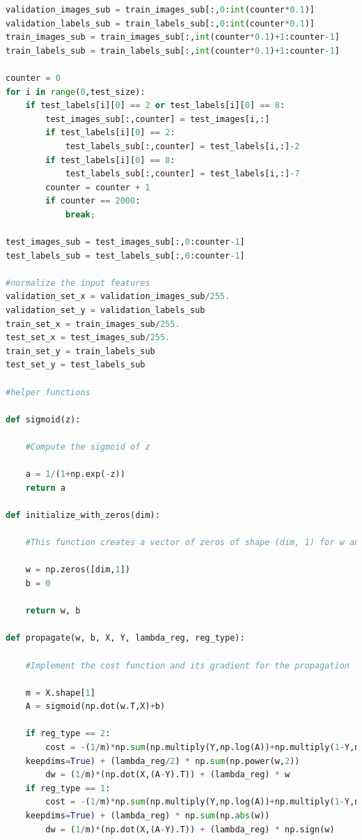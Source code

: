 \documentclass{article} %
\begin{document}
{\begin{lstlisting}[language=Python]
validation_images_sub = train_images_sub[:,0:int(counter*0.1)]
validation_labels_sub = train_labels_sub[:,0:int(counter*0.1)]
train_images_sub = train_images_sub[:,int(counter*0.1)+1:counter-1]
train_labels_sub = train_labels_sub[:,int(counter*0.1)+1:counter-1]

counter = 0
for i in range(0,test_size):
    if test_labels[i][0] == 2 or test_labels[i][0] == 8:
        test_images_sub[:,counter] = test_images[i,:]
        if test_labels[i][0] == 2:
            test_labels_sub[:,counter] = test_labels[i,:]-2
        if test_labels[i][0] == 8:
            test_labels_sub[:,counter] = test_labels[i,:]-7
        counter = counter + 1        
        if counter == 2000:
            break;
        
test_images_sub = test_images_sub[:,0:counter-1]
test_labels_sub = test_labels_sub[:,0:counter-1]

#normalize the input features
validation_set_x = validation_images_sub/255.
validation_set_y = validation_labels_sub
train_set_x = train_images_sub/255.
test_set_x = test_images_sub/255.
train_set_y = train_labels_sub
test_set_y = test_labels_sub

#helper functions

def sigmoid(z):

    #Compute the sigmoid of z

    a = 1/(1+np.exp(-z))  
    return a

def initialize_with_zeros(dim):

    #This function creates a vector of zeros of shape (dim, 1) for w and initializes b to 0.

    w = np.zeros([dim,1])
    b = 0
    
    return w, b

def propagate(w, b, X, Y, lambda_reg, reg_type):
   
    #Implement the cost function and its gradient for the propagation
    
    m = X.shape[1]
    A = sigmoid(np.dot(w.T,X)+b)
    
    if reg_type == 2:
        cost = -(1/m)*np.sum(np.multiply(Y,np.log(A))+np.multiply(1-Y,np.log(1-A)),
	keepdims=True) + (lambda_reg/2) * np.sum(np.power(w,2)) 
        dw = (1/m)*(np.dot(X,(A-Y).T)) + (lambda_reg) * w
    if reg_type == 1:
        cost = -(1/m)*np.sum(np.multiply(Y,np.log(A))+np.multiply(1-Y,np.log(1-A)),
	keepdims=True) + (lambda_reg) * np.sum(np.abs(w))
        dw = (1/m)*(np.dot(X,(A-Y).T)) + (lambda_reg) * np.sign(w)
    

\end{lstlisting}}
\end{document}
